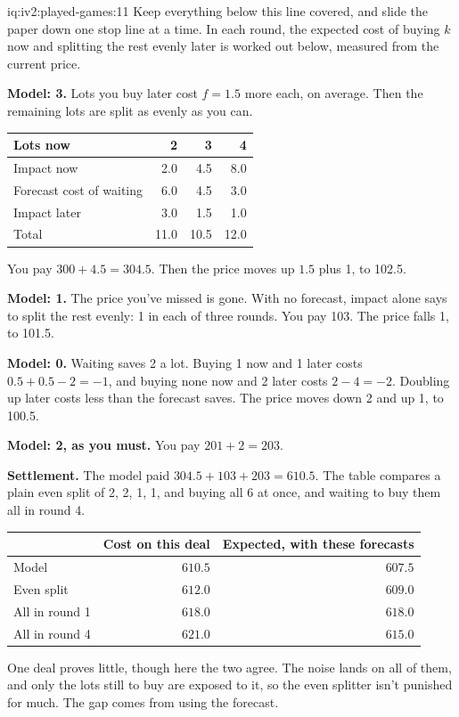 \begin{solution}{iq:iv2:played-games:11}
Keep everything below this line covered, and slide the paper down one stop line at a time. In each round, the expected cost of buying $k$ now and splitting the rest evenly later is worked out below, measured from the current price.

\ivstop
\textbf{Model: 3.} Lots you buy later cost $f = 1.5$ more each, on average. Then the remaining lots are split as evenly as you can.
\begin{center}\small
\begin{tabular}{@{}l*{3}{r}@{}}
Lots now & 2 & 3 & 4 \\ \hline
Impact now & 2.0 & 4.5 & 8.0 \\
Forecast cost of waiting & 6.0 & 4.5 & 3.0 \\
Impact later & 3.0 & 1.5 & 1.0 \\ \hline
Total & 11.0 & 10.5 & 12.0
\end{tabular}
\end{center}
You pay $300 + 4.5 = 304.5$. Then the price moves up $1.5$ plus 1, to 102.5.

\ivstop
\textbf{Model: 1.} The price you've missed is gone. With no forecast, impact alone says to split the rest evenly: 1 in each of three rounds. You pay 103. The price falls 1, to 101.5.

\ivstop
\textbf{Model: 0.} Waiting saves 2 a lot. Buying 1 now and 1 later costs $0.5 + 0.5 - 2 = -1$, and buying none now and 2 later costs $2 - 4 = -2$. Doubling up later costs less than the forecast saves. The price moves down 2 and up 1, to 100.5.

\ivstop
\textbf{Model: 2, as you must.} You pay $201 + 2 = 203$.

\medskip
\textbf{Settlement.} The model paid $304.5 + 103 + 203 = 610.5$. The table compares a plain even split of 2, 2, 1, 1, and buying all 6 at once, and waiting to buy them all in round 4.
\begin{center}\small
\begin{tabular}{@{}lrr@{}}
 & Cost on this deal & Expected, with these forecasts \\ \hline
Model & $610.5$ & $607.5$ \\
Even split & $612.0$ & $609.0$ \\
All in round 1 & $618.0$ & $618.0$ \\
All in round 4 & $621.0$ & $615.0$
\end{tabular}
\end{center}
One deal proves little, though here the two agree. The noise lands on all of them, and only the lots still to buy are exposed to it, so the even splitter isn't punished for much. The gap comes from using the forecast.


\end{solution}
